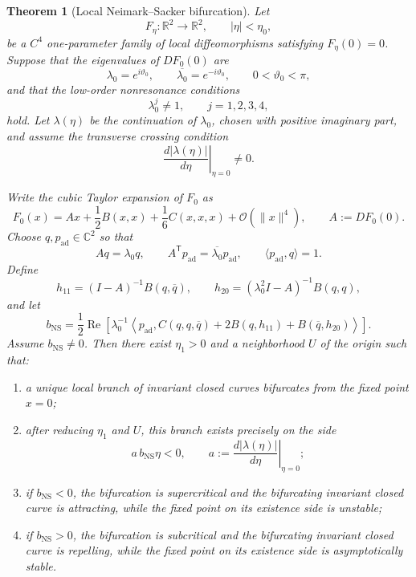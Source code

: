 \documentclass[11pt]{amsart}
\newtheorem{theorem}{Theorem}[section]
\theoremstyle{remark}
\newcommand{\R}{\mathbb{R}}
\newcommand{\cO}{\mathcal{O}}
\begin{document}
\begin{theorem}[Local Neimark--Sacker bifurcation]\label{thm:abstract-NS}
Let
\[
 F_\eta:\R^2\longrightarrow\R^2,\qquad |\eta|<\eta_0,
\]
be a \(C^4\) one-parameter family of local diffeomorphisms satisfying
\(F_\eta(0)=0\).  Suppose that the eigenvalues of \(DF_0(0)\) are
\[
 \lambda_0=e^{i\vartheta_0},\qquad
 \overline{\lambda_0}=e^{-i\vartheta_0},\qquad
 0<\vartheta_0<\pi,
\]
and that the low-order nonresonance conditions
\begin{equation}\label{eq:abstract-nonresonance}
 \lambda_0^j\ne1,\qquad j=1,2,3,4,
\end{equation}
hold.  Let \(\lambda(\eta)\) be the continuation of \(\lambda_0\), chosen
with positive imaginary part, and assume the transverse crossing condition
\begin{equation}\label{eq:abstract-transversality}
 \left.\frac{d|\lambda(\eta)|}{d\eta}\right|_{\eta=0}\ne0.
\end{equation}

Write the cubic Taylor expansion of \(F_0\) as
\[
 F_0(x)=Ax+\frac12B(x,x)+\frac16C(x,x,x)+\cO(\|x\|^4),
 \qquad A:=DF_0(0).
\]
Choose \(q,p_{\mathrm{ad}}\in\mathbb{C}^2\) so that
\[
 Aq=\lambda_0q,\qquad
 A^{\mathsf T}p_{\mathrm{ad}}=\overline{\lambda_0}p_{\mathrm{ad}},
 \qquad
 \langle p_{\mathrm{ad}},q\rangle=1.
\]
Define
\[
 h_{11}=(I-A)^{-1}B(q,\overline q),
 \qquad
 h_{20}=(\lambda_0^2I-A)^{-1}B(q,q),
\]
and let
\[
 b_{\mathrm{NS}}
=\frac12\operatorname{Re}\left[
\lambda_0^{-1}
\left\langle p_{\mathrm{ad}},
C(q,q,\overline q)+2B(q,h_{11})+B(\overline q,h_{20})
\right\rangle\right].
\]
Assume \(b_{\mathrm{NS}}\ne0\).  Then there exist \(\eta_1>0\) and a
neighborhood \(U\) of the origin such that:
\begin{enumerate}[label=\textup{(\arabic*)},leftmargin=2em]
\item a unique local branch of invariant closed curves bifurcates from the
fixed point \(x=0\);
\item after reducing \(\eta_1\) and \(U\), this branch exists precisely on
the side
\[
 a\,b_{\mathrm{NS}}\eta<0,\qquad
 a:=\left.\frac{d|\lambda(\eta)|}{d\eta}\right|_{\eta=0};
\]
\item if \(b_{\mathrm{NS}}<0\), the bifurcation is supercritical and the
bifurcating invariant closed curve is attracting, while the fixed point on
its existence side is unstable;
\item if \(b_{\mathrm{NS}}>0\), the bifurcation is subcritical and the
bifurcating invariant closed curve is repelling, while the fixed point on
its existence side is asymptotically stable.
\end{enumerate}
\end{theorem}
\end{document}
